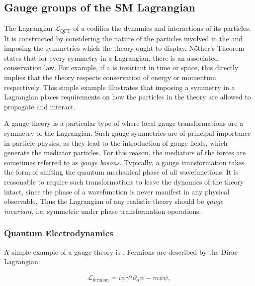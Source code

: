 \subsection{Gauge groups of the SM Lagrangian}
\label{sec:th:gauge}

The Lagrangian $\mathcal{L}_{\text{QFT}}$ of a \QFT codifies the dynamics and interactions of its particles. %
It is constructed by considering the nature of the particles involved in the \QFT and imposing the symmetries which the theory ought to display. N\"other's Theorem~\cite{Noether} states that for every symmetry in a Lagrangian, there is an associated conservation law. For example, if a \QFT is invariant in time or space, this directly implies that the theory respects conservation of energy or momentum respectively. This simple example illustrates that imposing a symmetry in a Lagrangian places requirements on how the particles in the theory are allowed to propagate and interact. 

A gauge theory is a particular type of \QFT where local gauge transformations are a symmetry of the Lagrangian. Such gauge symmetries are of principal importance in particle physics, as they lead to the introduction of gauge fields, which generate the mediator particles. For this reason, the mediators of the forces are sometimes referred to as \emph{gauge bosons}. 
Typically, a gauge transformation takes the form of shifting the quantum mechanical phase of all wavefunctions. It is reasonable to require such transformations to leave the dynamics of the theory intact, since the phase of a wavefunction is never manifest in any physical observable. Thus the Lagrangian of any realistic theory should be \emph{gauge invariant}, i.e. symmetric under phase transformation operations.  

\subsubsection{Quantum Electrodynamics}
\label{sec:th:qed}
A simple example of a gauge theory is \QED. 
Fermions are described by the Dirac Lagrangian:

\begin{equation}
\label{eq:th:dirac}
\mathcal{L}_{\textrm{fermion}} = i\overline{\psi} \gamma^{\alpha} \partial_{\alpha} \psi - m\overline{\psi}\psi,
\end{equation}

